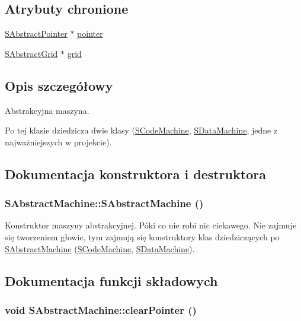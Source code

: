\subsection*{Atrybuty chronione}
\begin{CompactItemize}
\item 
\hyperlink{classSAbstractPointer}{SAbstractPointer} $\ast$ \hyperlink{classSAbstractMachine_7fb67b2cf326fa3176570ca65c573c79}{pointer}
\item 
\hyperlink{classSAbstractGrid}{SAbstractGrid} $\ast$ \hyperlink{classSAbstractMachine_08b7046c29a7a5f248f324edee91f2dc}{grid}
\end{CompactItemize}


\subsection{Opis szczegółowy}
Abstrakcyjna maszyna. 

Po tej klasie dziedzicza dwie klasy (\hyperlink{classSCodeMachine}{SCodeMachine}, \hyperlink{classSDataMachine}{SDataMachine}, jedne z najważniejszych w projekcie). 

\subsection{Dokumentacja konstruktora i destruktora}
\hypertarget{classSAbstractMachine_f0ffb270de2ea44e89123a873bc5660a}{
\subsubsection[{SAbstractMachine}]{\setlength{\rightskip}{0pt plus 5cm}SAbstractMachine::SAbstractMachine ()}}
\label{classSAbstractMachine_f0ffb270de2ea44e89123a873bc5660a}


Konstruktor maszyny abstrakcyjnej. Póki co nie robi nic ciekawego. Nie zajmuje się tworzeniem głowic, tym zajmują się konstruktory klas dziedziczących po \hyperlink{classSAbstractMachine}{SAbstractMachine} (\hyperlink{classSCodeMachine}{SCodeMachine}, \hyperlink{classSDataMachine}{SDataMachine}). 

\subsection{Dokumentacja funkcji składowych}
\hypertarget{classSAbstractMachine_87766a003773869a3438e92739d7c9a1}{
\subsubsection[{clearPointer}]{\setlength{\rightskip}{0pt plus 5cm}void SAbstractMachine::clearPointer ()}}
\label{classSAbstractMachine_87766a003773869a3438e92739d7c9a1}


